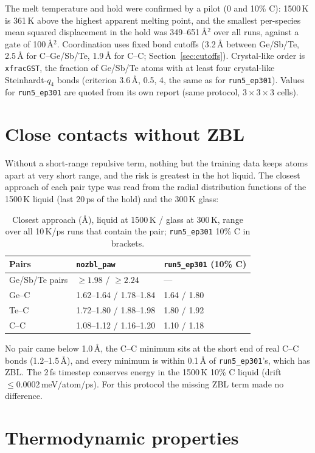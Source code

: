 \documentclass[11pt]{article}
\newcommand{\nozbl}{\texttt{nozbl\_paw}}
\newcommand{\runfive}{\texttt{run5\_ep301}}
\begin{document}
The melt temperature and hold were confirmed by a pilot (0 and 10\% C): 1500\,K is 361\,K above the highest apparent
melting point, and the smallest per-species mean squared displacement in the hold was 349--651\,\AA$^2$ over all runs,
against a gate of 100\,\AA$^2$. Coordination uses fixed bond cutoffs (3.2\,\AA{} between Ge/Sb/Te, 2.5\,\AA{} for
C--Ge/Sb/Te, 1.9\,\AA{} for C--C; Section~\ref{sec:cutoffs}). Crystal-like order is \texttt{xfracGST}, the fraction of
Ge/Sb/Te atoms with at least four crystal-like Steinhardt-$q_4$ bonds (criterion 3.6\,\AA, 0.5, 4, the same as for
\runfive{}). Values for \runfive{} are quoted from its own report (same protocol, $3\times3\times3$ cells).

\section{Close contacts without ZBL}
Without a short-range repulsive term, nothing but the training data keeps atoms apart at very short range, and the
risk is greatest in the hot liquid. The closest approach of each pair type was read from the radial distribution
functions of the 1500\,K liquid (last 20\,ps of the hold) and the 300\,K glass:

\begin{table}[H]
\centering
\caption{Closest approach (\AA), liquid at 1500\,K / glass at 300\,K, range over all 10\,K/ps runs that contain the pair; \runfive{} 10\% C in brackets.}
\begin{tabular}{lll}
\toprule
Pairs & \nozbl{} & \runfive{} (10\% C) \\
\midrule
Ge/Sb/Te pairs & $\geq 1.98$ / $\geq 2.24$ & --- \\
Ge--C & 1.62--1.64 / 1.78--1.84 & 1.64 / 1.80 \\
Te--C & 1.72--1.80 / 1.88--1.98 & 1.80 / 1.92 \\
C--C & 1.08--1.12 / 1.16--1.20 & 1.10 / 1.18 \\
\bottomrule
\end{tabular}
\end{table}

No pair came below 1.0\,\AA, the C--C minimum sits at the short end of real C--C bonds (1.2--1.5\,\AA), and every
minimum is within 0.1\,\AA{} of \runfive{}'s, which has ZBL. The 2\,fs timestep conserves energy in the 1500\,K 10\%
C liquid (drift $\leq 0.0002$\,meV/atom/ps). For this protocol the missing ZBL term made no difference.

\section{Thermodynamic properties}
\end{document}
